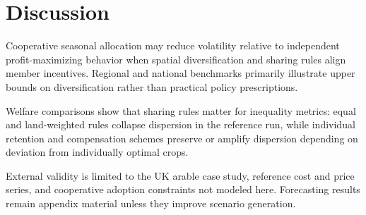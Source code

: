 \section{Discussion}
\label{sec:discussion}

Cooperative seasonal allocation may reduce volatility relative to independent profit-maximizing
behavior when spatial diversification and sharing rules align member incentives.
Regional and national benchmarks primarily illustrate upper bounds on diversification rather
than practical policy prescriptions.

Welfare comparisons show that sharing rules matter for inequality metrics: equal and
land-weighted rules collapse dispersion in the reference run, while individual retention
and compensation schemes preserve or amplify dispersion depending on deviation from individually
optimal crops.

External validity is limited to the UK arable case study, reference cost and price series,
and cooperative adoption constraints not modeled here.
Forecasting results remain appendix material unless they improve scenario generation.
